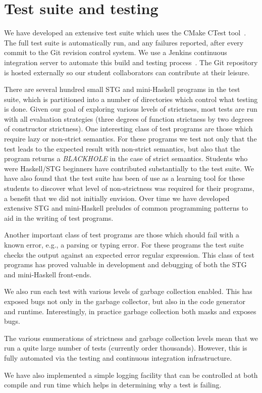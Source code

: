 \documentclass{llncs}
\begin{document}
\section{Test suite and testing}

We have developed an extensive test suite which uses the CMake CTest
tool~\cite{cmake-book}. The full test suite is automatically run, and any
failures reported, after every commit to the Git revision control system. We
use a Jenkins continuous integration server to automate this build and testing
process~\cite{jenkins-book}. The Git repository is hosted externally so our
student collaborators can contribute at their leisure.

There are several hundred small STG and mini-Haskell programs in the test suite, 
which is partitioned into a number of directories which control what
testing is done. Given our goal of exploring various
levels of strictness, most tests are run with all evaluation strategies (three
degrees of function strictness by two degrees of constructor strictness).
One interesting class of test programs are those which require lazy or non-strict
semantics. For these programs we test not only that the test leads to the expected
result with non-strict semantics, but also that the program returns a
\emph{BLACKHOLE} in the case of strict semantics. Students who were Haskell/STG
beginners have contributed substantially to the test suite. We have also found
that the test suite has been of use as a learning tool for these students to
discover what level of non-strictness was required for their programs,
a benefit that we did not initially envision. Over time we have developed
extensive STG and mini-Haskell preludes of common programming patterns to
aid in the writing of test programs.

Another important class of test programs are those which should fail with a
known error, e.g., a parsing or typing error.  For these programs the test
suite checks the output against an expected error regular expression. This
class of test programs has proved valuable in development and debugging of
both the STG and mini-Haskell front-ends.

We also run each test with various levels of garbage collection enabled. This
has exposed bugs not only in the garbage collector, but also in the code
generator and runtime.  Interestingly, in practice garbage collection both
masks and exposes bugs.

The various enumerations of strictness and garbage collection levels mean that
we run a quite large number of tests (currently order thousands). However,
this is fully automated via the testing and continuous integration
infrastructure.

We have also implemented a simple logging facility that can be controlled at 
both compile and run time which helps in determining why a test is failing.

%
%




\end{document}
